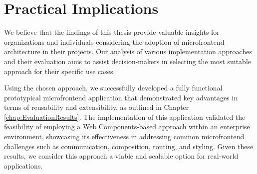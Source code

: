 \section{Practical Implications}
We believe that the findings of this thesis provide valuable insights for organizations and individuals considering the adoption of microfrontend architecture in their projects. Our analysis of various implementation approaches and their evaluation aims to assist decision-makers in selecting the most suitable approach for their specific use cases.

Using the chosen approach, we successfully developed a fully functional prototypical microfrontend application that demonstrated key advantages in terms of reusability and extensibility, as outlined in Chapter \ref{chap:EvaluationResults}. The implementation of this application validated the feasibility of employing a Web Components-based approach within an enterprise environment, showcasing its effectiveness in addressing common microfrontend challenges such as communication, composition, routing, and styling. Given these results, we consider this approach a viable and scalable option for real-world applications.